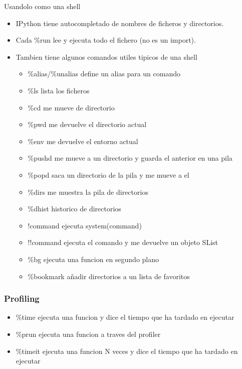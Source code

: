 \documentclass[10pt]{beamer}
\begin{document}
  \begin{frame}{Usandolo como una shell}
    \begin{itemize}
      \item IPython tiene autocompletado de nombres de ficheros y directorios.
      \item Cada \%run lee y ejecuta todo el fichero (no es un import).
      \item Tambien tiene algunos comandos utiles tipicos de una shell
      \begin{itemize}
        \item \%alias/\%unalias define un alias para un comando
        \item \%ls lista los ficheros
        \item \%cd me mueve de directorio
        \item \%pwd me devuelve el directorio actual
        \item \%env me devuelve el entorno actual
        \item \%pushd me mueve a un directorio y guarda el anterior en una pila
        \item \%popd saca un directorio de la pila y me mueve a el
        \item \%dirs me muestra la pila de directorios
        \item \%dhist historico de directorios
        \item !command ejecuta system(command)
        \item !!command ejecuta el comando y me devuelve un objeto SList
        \item \%bg ejecuta una funcion en segundo plano
        \item \%bookmark añadir directorios a un lista de favoritos
      \end{itemize}
    \end{itemize}
  \end{frame}

  \begin{frame}
    \frametitle{Profiling}
    \begin{itemize}
      \item \%time ejecuta una funcion y dice el tiempo que ha tardado en ejecutar
      \item \%prun ejecuta una funcion a traves del profiler
      \item \%timeit ejecuta una funcion N veces y dice el tiempo que ha tardado en ejecutar
    \end{itemize}
  \end{frame}
  
\end{document}
